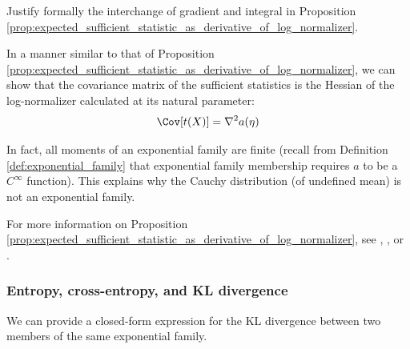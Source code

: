 \documentclass{article} %
\begin{document}
\begin{task}
Justify formally the interchange of gradient and integral in Proposition \ref{prop:expected_sufficient_statistic_as_derivative_of_log_normalizer}.	
\end{task}

\begin{remark}
In a manner similar to that of Proposition \ref{prop:expected_sufficient_statistic_as_derivative_of_log_normalizer}, we can show that the covariance matrix of the sufficient statistics is the Hessian of the log-normalizer calculated at its natural parameter:
\[ \Cov[t(X)] = \nabla^2 a(\eta) \]	

In fact, all moments of an exponential family are finite (recall from Definition \ref{def:exponential_family} that exponential family membership requires $a$ to be a $C^\infty$ function).  This explains why the Cauchy distribution (of undefined mean) is not an exponential family.
\label{rk:any_exponential_family_has_finite_moments}
\end{remark}



For more information on Proposition \ref{prop:expected_sufficient_statistic_as_derivative_of_log_normalizer}, see \cite{jordan_ef}, \cite{nielsen2010entropies}, or \cite{nielsen2009statistical}.   

\subsubsection{Entropy, cross-entropy, and KL divergence}

We can provide a closed-form expression for the KL divergence between two members of the same exponential family. 
\end{document}
